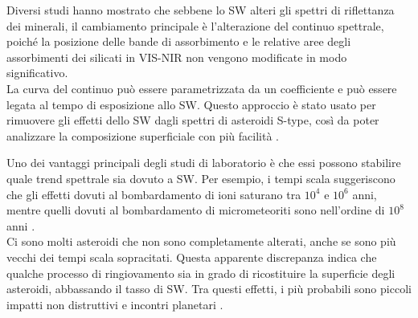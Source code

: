 \documentclass[a4paper,11pt,openright]{book}
\begin{document}
Diversi studi hanno mostrato che sebbene lo SW alteri gli spettri di riflettanza dei minerali, il cambiamento principale è l'alterazione del continuo spettrale, poiché la posizione delle bande di assorbimento e le relative aree degli assorbimenti dei silicati in VIS-NIR non vengono modificate in modo significativo.\\
La curva del continuo può essere parametrizzata da un coefficiente e può essere legata al tempo di esposizione allo SW. Questo approccio è stato usato per rimuovere gli effetti dello SW dagli spettri di asteroidi S-type, così da poter analizzare la composizione superficiale con più facilità \citep{BRUNETTO2006327, popescu_modelling_2012}.

Uno dei vantaggi principali degli studi di laboratorio è che essi possono stabilire quale trend spettrale sia dovuto a SW. 
Per esempio, i tempi scala suggeriscono che gli effetti dovuti al bombardamento di ioni saturano tra $10^4$ e $10^6$ anni, mentre quelli dovuti al bombardamento di micrometeoriti sono nell'ordine di $10^8$ anni \citep{loeffler_irradiation_2009, brunetto_space_2006}.\\
Ci sono molti asteroidi che non sono completamente alterati, anche se sono più vecchi dei tempi scala sopracitati. Questa apparente discrepanza indica che qualche processo di ringiovamento sia in grado di ricostituire la superficie degli asteroidi, abbassando il tasso di SW. Tra questi effetti, i più probabili sono piccoli impatti non distruttivi e incontri planetari \citep{shestopalov_optical_2013}.
\end{document}
